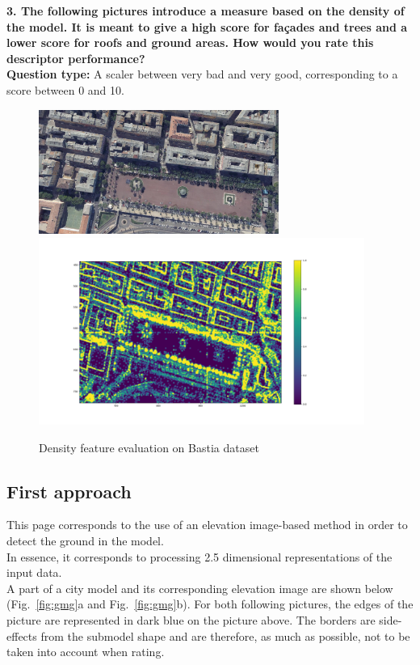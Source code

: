 \documentclass{kththesis}
\begin{document}
\textbf{3.  The following pictures introduce a measure based on the density of the model. It is meant to give a high score for façades and trees and a lower score for roofs and ground areas. How would you rate this descriptor performance?} \\ 
\textbf{Question type:} A scaler between very bad and very good, corresponding to a score between 0 and 10. 
\begin{figure}[H]
    \centering
    \includegraphics[width=0.7\textwidth]{images/Results/MRF_survey/bastia_view.png} \\ 
    \centering 
    \includegraphics[width=0.95\textwidth]{images/Results/MRF_survey/bastia_density.png}
    \caption{Density feature evaluation on Bastia dataset}
    \label{fig:hels_density}
\end{figure}

\subsection{First approach}
This page corresponds to the use of an elevation image-based method in order to detect the ground in the model. \\
In essence, it corresponds to processing 2.5 dimensional representations of the input data. \\
A part of a city model and its corresponding elevation image are shown below (Fig.~\ref{fig:gmg}a and Fig.~\ref{fig:gmg}b).
For both following pictures, the edges of the picture are represented in dark blue on the picture above. The borders are side-effects from the submodel shape and are therefore, as much as possible, not to be taken into account when rating. \\
 
\end{document}
